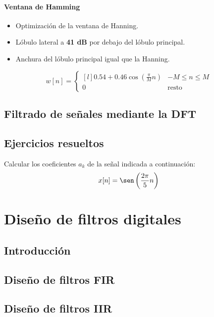\documentclass[a4paper,oneside]{book}
\begin{document}
\begin{multicols}{2}
	\subsubsection{Ventana de Hamming}\vspace{\parskip}
	\begin{itemize}
		\item Optimización de la ventana de Hanning.
		\item Lóbulo lateral a \textbf{41 dB} por debajo del lóbulo principal.
		\item Anchura del lóbulo principal igual que la Hanning.
	\end{itemize}
	\[ w[n] = \left\lbrace
	\begin{matrix*}[l]
		\displaystyle{0.54 + 0.46\cos \left( \frac{\pi}{M}n \right)} & -M\leq n \leq M\\
		0 & \textrm{resto}
	\end{matrix*} \right. \]
\end{multicols}

\section{Filtrado de señales mediante la DFT}

\section{Ejercicios resueltos}


Calcular los coeficientes $a_k$ de la señal indicada a continuación: \[ x[n] = \sen \left( \frac{2\pi}{5}n \right) \]



\chapter{Diseño de filtros digitales} \label{temaDeFiltros}

\section{Introducción}

\section{Diseño de filtros FIR}

\section{Diseño de filtros IIR}
\end{document}
